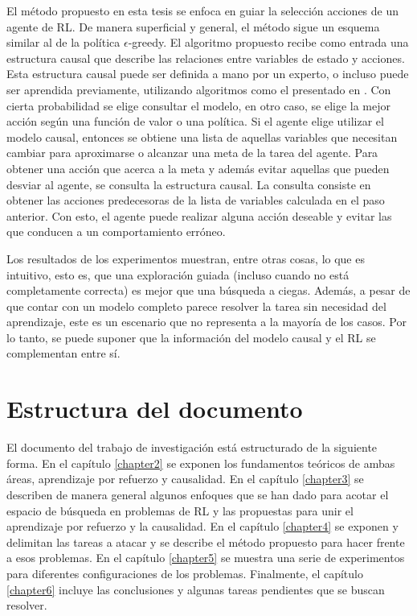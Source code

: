 El método propuesto en esta tesis se enfoca en guiar la
selección acciones de un agente de RL. De manera superficial y general, el método sigue un esquema similar al de la política $\epsilon$-greedy.
El algoritmo propuesto recibe como entrada una estructura causal que describe las relaciones entre variables de estado y acciones.
Esta estructura causal puede ser definida a mano por un experto,
o incluso puede ser aprendida previamente, utilizando algoritmos como
el presentado en \cite{gonzalezsoto2020causal}.
Con cierta probabilidad se elige consultar el modelo, en otro caso, se elige la mejor acción según una función de valor o una política. 
Si el agente elige utilizar el modelo causal, entonces se obtiene una lista de aquellas variables que necesitan cambiar para aproximarse o alcanzar una meta de la tarea del agente. Para obtener una acción que acerca a la meta y además evitar aquellas que pueden desviar al agente, se consulta la estructura causal. La consulta consiste en obtener las acciones predecesoras de la lista de variables calculada en el paso anterior. Con esto, 
el agente puede realizar alguna acción deseable y evitar las que conducen a un comportamiento erróneo.

Los resultados de los experimentos muestran, entre otras cosas, lo que es intuitivo, esto es, que una exploración guiada (incluso cuando no está completamente correcta) es mejor que una búsqueda a ciegas. Además, a pesar de que contar con un modelo completo parece resolver la tarea sin necesidad del aprendizaje, este es un escenario que no representa a la mayoría de los casos. Por lo tanto, se puede suponer que la información del modelo causal y el RL se complementan entre sí.

\section{Estructura del documento}

El documento del trabajo de investigación está estructurado de la 
siguiente forma.
En el capítulo \ref{chapter2} se exponen los fundamentos teóricos de ambas áreas, aprendizaje por refuerzo y causalidad.
En el capítulo \ref{chapter3} se describen de manera general algunos enfoques
que se han dado para acotar el espacio de búsqueda en problemas
de RL y las propuestas para unir el aprendizaje por refuerzo y
la causalidad. En el capítulo \ref{chapter4} se exponen y
delimitan las tareas a atacar y se describe el método propuesto para hacer frente a esos problemas. En el capítulo \ref{chapter5} se muestra una serie de experimentos
para diferentes configuraciones de los problemas. Finalmente,
el capítulo \ref{chapter6} incluye las conclusiones y algunas tareas pendientes que se buscan resolver.
